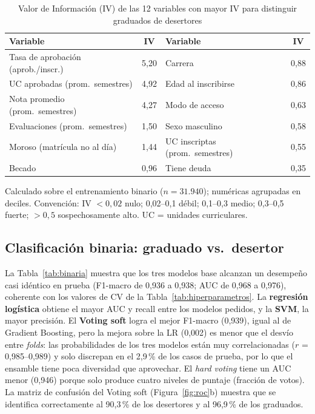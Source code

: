 \documentclass[titlepage,a4paper]{article}
\begin{document}
\begin{table}[!htbp]
\centering
\caption{Valor de Información (IV) de las 12 variables con mayor IV para distinguir graduados de desertores}
\label{tab:iv}
\small
\begin{tabular}{lc@{\hspace{1cm}}lc}
\toprule
\textbf{Variable} & \textbf{IV} & \textbf{Variable} & \textbf{IV} \\
\midrule
Tasa de aprobación (aprob./inscr.) & 5,20 & Carrera & 0,88 \\
UC aprobadas (prom.\ semestres) & 4,92 & Edad al inscribirse & 0,86 \\
Nota promedio (prom.\ semestres) & 4,27 & Modo de acceso & 0,63 \\
Evaluaciones (prom.\ semestres) & 1,50 & Sexo masculino & 0,58 \\
Moroso (matrícula no al día) & 1,44 & UC inscriptas (prom.\ semestres) & 0,55 \\
Becado & 0,96 & Tiene deuda & 0,35 \\
\bottomrule
\end{tabular}

\vspace{2pt}
{\scriptsize Calculado sobre el entrenamiento binario ($n = 31.940$); numéricas agrupadas en deciles. Convención: IV $< 0{,}02$ nulo; 0,02--0,1 débil; 0,1--0,3 medio; 0,3--0,5 fuerte; $> 0{,}5$ sospechosamente alto. UC = unidades curriculares.\par}
\end{table}



\subsection{Clasificación binaria: graduado vs.\ desertor}\label{sec:binaria}

La Tabla~\ref{tab:binaria} muestra que los tres modelos base alcanzan un desempeño casi idéntico en prueba (F1-macro de 0,936 a 0,938; AUC de 0,968 a 0,976), coherente con los valores de CV de la Tabla~\ref{tab:hiperparametros}. La \textbf{regresión logística} obtiene el mayor AUC y recall entre los modelos pedidos, y la \textbf{SVM}, la mayor precisión. El \textbf{Voting soft} logra el mejor F1-macro (0,939), igual al de Gradient Boosting, pero la mejora sobre la LR (0,002) es menor que el desvío entre \textit{folds}: las probabilidades de los tres modelos están muy correlacionadas ($r$ = 0,985--0,989) y solo discrepan en el 2,9\,\% de los casos de prueba, por lo que el ensamble tiene poca diversidad que aprovechar. El \textit{hard voting} tiene un AUC menor (0,946) porque solo produce cuatro niveles de puntaje (fracción de votos). La matriz de confusión del Voting soft (Figura~\ref{fig:roc}b) muestra que se identifica correctamente al 90,3\,\% de los desertores y al 96,9\,\% de los graduados.
\end{document}

